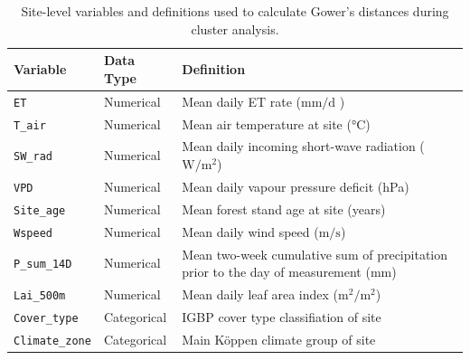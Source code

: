 \begin{table}[H]
	\caption{\centering Site-level variables and definitions used to calculate Gower's distances during cluster analysis.}
	\centering
	\begin{tabularx}{\linewidth}{llX}
		\toprule
		Variable & Data Type & Definition \\
		\midrule
		\texttt{\ac{ET}} & Numerical &  Mean daily \ac{ET} rate ($\si{\milli\metre\per\day}$ )\\
		\texttt{T\_air} & Numerical & Mean air temperature at site (\si{\degreeCelsius}) \\
		\texttt{SW\_rad} & Numerical & Mean daily incoming short-wave radiation ($\si{\watt\per\metre\squared}$) \\
		\texttt{VPD} & Numerical & Mean daily vapour pressure deficit (\si{\hecto\pascal}) \\
		\texttt{Site\_age} & Numerical & Mean forest stand age at site (years) \\
		\texttt{Wspeed} & Numerical & Mean daily wind speed ($\si{\meter\per\second}$) \\
		\texttt{P\_sum\_14D} & Numerical & Mean two-week cumulative sum of precipitation prior to the day of measurement ($\si{\milli\metre}$) \\
		\texttt{Lai\_500m} & Numerical & Mean daily leaf area index ($\si{\metre\squared\per\metre\squared}$) \\
		\texttt{Cover\_type} & Categorical & IGBP cover type classifiation of site \\
		\texttt{Climate\_zone} & Categorical & Main K\"{o}ppen climate group of site\\
	\end{tabularx}
	\label{tab:cluster_vars}
\end{table}






